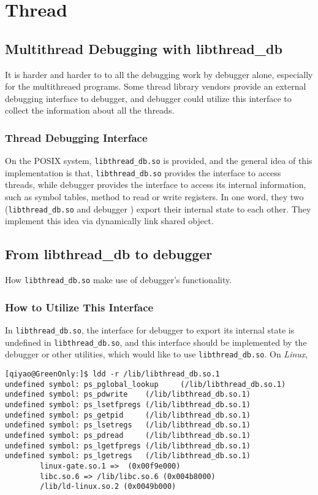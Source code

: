 
\chapter{Thread}
\label{chap:thread}

\section{Multithread Debugging with libthread\_db}
It is harder and harder to to all the debugging work by debugger alone, especially for the
multithreaed programs.  Some thread library vendors provide an external debugging interface
to debugger, and debugger could utilize this interface to collect the information about all
the threads.

\subsection{Thread Debugging Interface}
On the POSIX system, \texttt{libthread\_db.so} is provided, and the general idea of this
implementation is that, \texttt{libthread\_db.so} provides the interface to access threads,
while debugger provides the interface to access its internal information, such as symbol tables,
method to read or write registers.  In one word, they two (\texttt{libthread\_db.so} and debugger
) export their internal state to each other.  They implement this idea via dynamically link shared
object.

\section{From libthread\_db to debugger}

How \texttt{libthread\_db.so} make use of debugger's functionality.

\subsection{How to Utilize This Interface}
In \texttt{libthread\_db.so}, the interface for debugger to export its internal state is undefined
in \texttt{libthread\_db.so}, and this interface should be implemented by the debugger or other utilities,
which would like to use \texttt{libthread\_db.so}.  On \emph{Linux},

\begin{verbatim}
[qiyao@GreenOnly:]$ ldd -r /lib/libthread_db.so.1
undefined symbol: ps_pglobal_lookup     (/lib/libthread_db.so.1)
undefined symbol: ps_pdwrite    (/lib/libthread_db.so.1)
undefined symbol: ps_lsetfpregs (/lib/libthread_db.so.1)
undefined symbol: ps_getpid     (/lib/libthread_db.so.1)
undefined symbol: ps_lsetregs   (/lib/libthread_db.so.1)
undefined symbol: ps_pdread     (/lib/libthread_db.so.1)
undefined symbol: ps_lgetfpregs (/lib/libthread_db.so.1)
undefined symbol: ps_lgetregs   (/lib/libthread_db.so.1)
        linux-gate.so.1 =>  (0x00f9e000)
        libc.so.6 => /lib/libc.so.6 (0x004b8000)
        /lib/ld-linux.so.2 (0x0049b000)
\end{verbatim}

